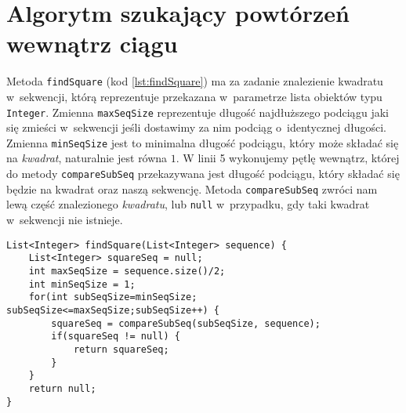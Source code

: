 \documentclass[document]{xmgr}
\begin{document}
\section{Algorytm szukający powtórzeń wewnątrz ciągu}






Metoda \texttt{findSquare} (kod \ref{lst:findSquare}) ma za zadanie znalezienie kwadratu w~sekwencji, którą reprezentuje przekazana w~parametrze lista obiektów typu \texttt{Integer}. Zmienna \mbox{\texttt{maxSeqSize}} reprezentuje długość najdłuższego podciągu jaki się zmieści w~sekwencji jeśli dostawimy za nim podciąg o~identycznej długości. Zmienna \mbox{\texttt{minSeqSize}} jest to minimalna długość podciągu, który może składać się na \emph{kwadrat}, naturalnie jest równa $1$. W linii 5 wykonujemy pętlę wewnątrz, której do metody \texttt{compareSubSeq} przekazywana jest długość podciągu, który składać się będzie na kwadrat oraz naszą sekwencję. Metoda \texttt{compareSubSeq} zwróci nam lewą część znalezionego \emph{kwadratu}, lub \texttt{null} w~przypadku, gdy taki kwadrat w~sekwencji nie istnieje.

\begin{lstlisting}[caption={Metoda szukająca \emph{kwadratów} wewnątrz listy.},label=lst:findSquare]
List<Integer> findSquare(List<Integer> sequence) {
	List<Integer> squareSeq = null;
	int maxSeqSize = sequence.size()/2;
	int minSeqSize = 1;
	for(int subSeqSize=minSeqSize; subSeqSize<=maxSeqSize;subSeqSize++) {
		squareSeq = compareSubSeq(subSeqSize, sequence);
		if(squareSeq != null) {
			return squareSeq;
		}
	}
	return null;
}
\end{lstlisting}
\end{document}
